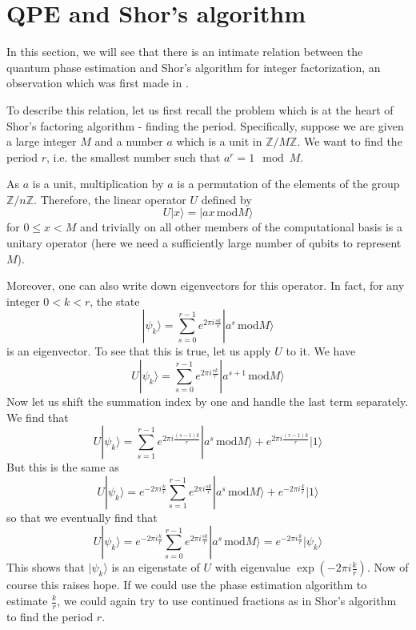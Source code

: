 \documentclass[a4paper, draft]{article}
\theoremstyle{own}
\theoremstyle{remark}
\newcommand{\Z}{\mathbb{Z}}
\begin{document}
\section{QPE and Shor's algorithm}

In this section, we will see that there is an intimate relation between the quantum phase estimation and Shor's algorithm for integer factorization, an observation which was first made in \cite{Kitaev}.

To describe this relation, let us first recall the problem which is at the heart of Shor's factoring algorithm - finding the period. Specifically, suppose we are given a large integer $M$ and a number $a$ which is a unit in $\Z/M\Z$. We want to find the period $r$, i.e. the smallest number such that $a^r =1 \mod M$. 

As $a$ is a unit, multiplication by $a$ is a permutation of the elements of the group $\Z / n\Z$. Therefore, the linear operator $U$ defined by
$$
U |x \rangle = |a x \, \text{mod} M \rangle
$$
for $0 \leq x < M$ and trivially on all other members of the computational basis is a unitary operator (here we need a sufficiently large number of qubits to represent $M$).

Moreover, one can also write down eigenvectors for this operator. In fact, for any integer $0 < k < r$, the state
$$
|\psi_k \rangle = \sum_{s=0}^{r-1} e^{2\pi i \frac{sk}{r}} |a^s \, \text{mod} M \rangle
$$
is an eigenvector. To see that this is true, let us apply $U$ to it. We have 
$$
U  |\psi_k \rangle = \sum_{s=0}^{r-1} e^{2\pi i \frac{sk}{r}}
|a^{s+1} \, \text{mod} M\rangle 
$$
Now let us shift the summation index by one and handle the last term separately. We find that
$$
U  |\psi_k \rangle = \sum_{s=1}^{r-1} e^{2\pi i \frac{(s-1)k}{r}}
|a^s \, \text{mod} M\rangle  + e^{2\pi i \frac{(r-1)k}{r}} |1 \rangle
$$
But this is the same as
$$
U  |\psi_k \rangle = e^{-2\pi i \frac{k}{r}} \sum_{s=1}^{r-1} e^{2\pi i \frac{sk}{r}}
|a^s \, \text{mod} M\rangle  + e^{-2\pi i \frac{k}{r}} |1 \rangle
$$
so that we eventually find that
$$
U  |\psi_k \rangle = e^{-2\pi i \frac{k}{r}} \sum_{s=0}^{r-1} e^{2\pi i \frac{sk}{r}}
|a^s \, \text{mod} M\rangle   = e^{-2\pi i \frac{k}{r}} |\psi_k \rangle
$$
This shows that $|\psi_k \rangle$ is an eigenstate of $U$ with eigenvalue $\exp(-2\pi i \frac{k}{r})$. Now of course this raises hope. If we could use the phase estimation algorithm to estimate $\frac{k}{r}$, we could again try to use continued fractions as in Shor's algorithm to find the period $r$. 
\end{document}
